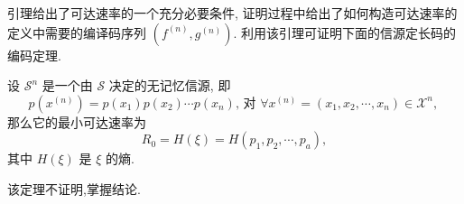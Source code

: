 引理给出了可达速率的一个充分必要条件, 证明过程中给出了如何构造可达速率的定义中需要的编译码序列 $ \left(f^{(n)}, g^{(n)}\right) $. 利用该引理可证明下面的信源定长码的编码定理.

\begin{theorem}
 设 $ \mathscr{S}^{n} $ 是一个由 $ \mathscr{S} $ 决定的无记忆信源, 即
$$
p\left(x^{(n)}\right)=p\left(x_{1}\right) p\left(x_{2}\right) \cdots p\left(x_{n}\right) \text {, 对 } \forall x^{(n)}=\left(x_{1}, x_{2}, \cdots, x_{n}\right) \in \mathscr{X}^{n} \text {, }
$$
那么它的最小可达速率为
$$
R_{0}=H(\xi)=H\left(p_{1}, p_{2}, \cdots, p_{a}\right),
$$
其中 $ H(\xi) $ 是 $ \xi $ 的熵.
\end{theorem}
该定理不证明,掌握结论.

